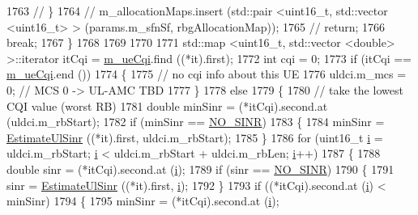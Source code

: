 \begin{DoxyCode}
1763 \textcolor{comment}{//            \}}
1764 \textcolor{comment}{//          m\_allocationMaps.insert (std::pair <uint16\_t, std::vector <uint16\_t> > (params.m\_sfnSf,
       rbgAllocationMap));}
1765 \textcolor{comment}{//          return;}
1766           \textcolor{keywordflow}{break};
1767         \}
1768 
1769 
1770 
1771       std::map <uint16\_t, std::vector <double> >::iterator itCqi = \hyperlink{classns3_1_1PfFfMacScheduler_acf67c0074356c705e8bd89bb49ddd5ad}{m\_ueCqi}.find ((*it).first);
1772       \textcolor{keywordtype}{int} cqi = 0;
1773       \textcolor{keywordflow}{if} (itCqi == \hyperlink{classns3_1_1PfFfMacScheduler_acf67c0074356c705e8bd89bb49ddd5ad}{m\_ueCqi}.end ())
1774         \{
1775           \textcolor{comment}{// no cqi info about this UE}
1776           uldci.m\_mcs = 0; \textcolor{comment}{// MCS 0 -> UL-AMC TBD}
1777         \}
1778       \textcolor{keywordflow}{else}
1779         \{
1780           \textcolor{comment}{// take the lowest CQI value (worst RB)}
1781           \textcolor{keywordtype}{double} minSinr = (*itCqi).second.at (uldci.m\_rbStart);
1782           \textcolor{keywordflow}{if} (minSinr == \hyperlink{cqa-ff-mac-scheduler_8h_a520d71777be043568160c783a9c65fd5}{NO\_SINR})
1783             \{
1784               minSinr = \hyperlink{classns3_1_1PfFfMacScheduler_a1aa80e0dfaceffc9619450c0b31bee01}{EstimateUlSinr} ((*it).first, uldci.m\_rbStart);
1785             \}
1786           \textcolor{keywordflow}{for} (uint16\_t \hyperlink{bernuolliDistribution_8m_a6f6ccfcf58b31cb6412107d9d5281426}{i} = uldci.m\_rbStart; \hyperlink{bernuolliDistribution_8m_a6f6ccfcf58b31cb6412107d9d5281426}{i} < uldci.m\_rbStart + uldci.m\_rbLen; 
      \hyperlink{bernuolliDistribution_8m_a6f6ccfcf58b31cb6412107d9d5281426}{i}++)
1787             \{
1788               \textcolor{keywordtype}{double} sinr = (*itCqi).second.at (\hyperlink{bernuolliDistribution_8m_a6f6ccfcf58b31cb6412107d9d5281426}{i});
1789               \textcolor{keywordflow}{if} (sinr == \hyperlink{cqa-ff-mac-scheduler_8h_a520d71777be043568160c783a9c65fd5}{NO\_SINR})
1790                 \{
1791                   sinr = \hyperlink{classns3_1_1PfFfMacScheduler_a1aa80e0dfaceffc9619450c0b31bee01}{EstimateUlSinr} ((*it).first, \hyperlink{bernuolliDistribution_8m_a6f6ccfcf58b31cb6412107d9d5281426}{i});
1792                 \}
1793               \textcolor{keywordflow}{if} ((*itCqi).second.at (\hyperlink{bernuolliDistribution_8m_a6f6ccfcf58b31cb6412107d9d5281426}{i}) < minSinr)
1794                 \{
1795                   minSinr = (*itCqi).second.at (\hyperlink{bernuolliDistribution_8m_a6f6ccfcf58b31cb6412107d9d5281426}{i});

\end{DoxyCode}
